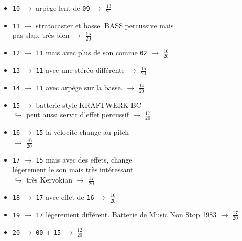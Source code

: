 \documentclass[a4paper, 13pt]{article}
\begin{document}
\begin{itemize}
    \item \texttt{10} $\rightarrow$ arpège lent de \texttt{09} $\rightarrow$ \Large{$\frac{13}{20}$} \normalsize \vspace{0.2cm}
    \item \texttt{11} $\rightarrow$ stratocaster et basse. BASS percussive mais \\pas slap, très bien $\rightarrow$ \Large{$\frac{15}{20}$} \normalsize \vspace{0.2cm}
    \item \texttt{12} $\rightarrow$ \texttt{11} mais avec plus de son comme \texttt{02} $\rightarrow$ \Large{$\frac{16}{20}$} \normalsize \vspace{0.2cm}
    \item \texttt{13} $\rightarrow$ \texttt{11} avec une stéréo différente $\rightarrow$ \Large{$\frac{15}{20}$} \normalsize \vspace{0.2cm}
    \item \texttt{14} $\rightarrow$ \texttt{11} avec arpège sur la basse. $\rightarrow$ \Large{$\frac{14}{20}$} \normalsize \vspace{0.2cm}
    \item \texttt{15} $\rightarrow$ batterie style KRAFTWERK-BC \\ $\hookrightarrow$ peut aussi servir d'effet percussif $\rightarrow$ \Large{$\frac{17}{20}$} \normalsize \vspace{0.2cm}
    \item \texttt{16} $\rightarrow$ \texttt{15} la vélocité change au pitch \\ $\rightarrow$ \Large{$\frac{16}{20}$} \normalsize \vspace{0.2cm}
    \item \texttt{17} $\rightarrow$ \texttt{15} mais avec des effets, change \\légerement le son mais très intéressant \\ $\hookrightarrow$ très Kervokian $\rightarrow$ \Large{$\frac{17}{20}$} \normalsize \vspace{0.2cm}
    \item \texttt{18} $\rightarrow$ \texttt{17} avec effet de \texttt{16} $\rightarrow$ \Large{$\frac{16}{20}$} \normalsize \vspace{0.2cm}
    \item \texttt{19} $\rightarrow$ \texttt{17} légerement différent. Batterie de Music Non Stop 1983 $\rightarrow$ \Large{$\frac{17}{20}$} \normalsize \vspace{0.2cm}
    \item \texttt{20} $\rightarrow$ \texttt{00} + \texttt{15} $\rightarrow$ \Large{$\frac{12}{20}$} \normalsize \vspace{0.2cm}

\end{itemize}
\end{document}
